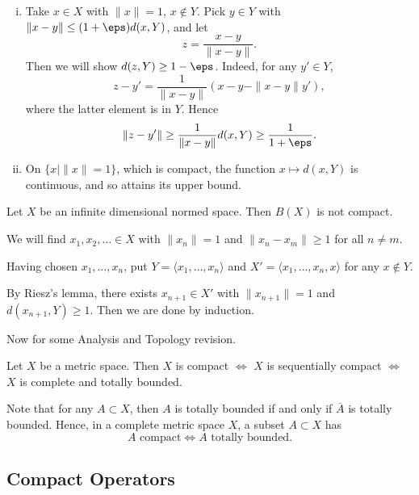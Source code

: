 \documentclass[12pt]{article}
\begin{document}
\begin{proofbox}


	\begin{enumerate}[(i)]
		\item Take $x \in X$ with $\|x\| = 1$, $x \not \in Y$. Pick $y \in Y$ with $\|x - y\| \leq (1+\eps) d(x, Y)$, and let
			\[
			z = \frac{x - y}{\|x-y\|}.
			\]
			Then we will show $d(z, Y) \geq 1 - \eps$. Indeed, for any $y' \in Y$,
			\[
			z - y' = \frac{1}{\|x-y\|} (x - y - \|x-y\|y'),
			\]
			where the latter element is in $Y$. Hence
			\[
			\|z - y'\| \geq \frac{1}{\|x-y\|}d(x,Y) \geq \frac{1}{1 + \eps}.
			\]
		\item On $\{x \mid \|x\|=1\}$, which is compact, the function $x \mapsto d(x, Y)$ is continuous, and so attains its upper bound.
	\end{enumerate}
\end{proofbox}

\begin{corollary}
	Let $X$ be an infinite dimensional normed space. Then $B(X)$ is not compact.
\end{corollary}

\begin{proofbox}
	We will find $x_1, x_2, \ldots \in X$ with $\|x_n\| = 1$ and $\|x_n - x_m\| \geq 1$ for all $n \neq m$.

	Having chosen $x_1, \ldots, x_n$, put $Y = \langle x_1, \ldots, x_n \rangle$ and $X' = \langle x_1, \ldots, x_n, x\rangle$ for any $x \not \in Y$.

	By Riesz's lemma, there exists $x_{n+1} \in X'$ with $\|x_{n+1}\| = 1$ and $d(x_{n+1}, Y) \geq 1$. Then we are done by induction.
\end{proofbox}

Now for some Analysis and Topology revision.

Let $X$ be a metric space. Then $X$ is compact $\iff$ $X$ is sequentially compact $\iff$ $X$ is complete and totally bounded.

Note that for any $A \subset X$, then $A$ is totally bounded if and only if $\overline{A}$ is totally bounded. Hence, in a complete metric space $X$, a subset $A \subset X$ has
\[
	A \text{ compact} \iff A \text{ totally bounded}.
\]


\subsection{Compact Operators}
\label{sub:compact_ops}
\end{document}
